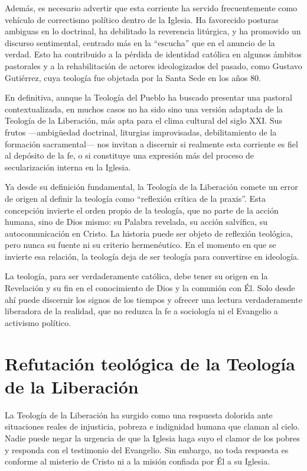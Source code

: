 \documentclass[12pt]{article}
\begin{document}
Además, es necesario advertir que esta corriente ha servido frecuentemente como vehículo de correctismo político dentro de la Iglesia. Ha favorecido posturas ambiguas en lo doctrinal, ha debilitado la reverencia litúrgica, y ha promovido un discurso sentimental, centrado más en la “escucha” que en el anuncio de la verdad. Esto ha contribuido a la pérdida de identidad católica en algunos ámbitos pastorales y a la rehabilitación de actores ideologizados del pasado, como Gustavo Gutiérrez, cuya teología fue objetada por la Santa Sede en los años 80.

En definitiva, aunque la Teología del Pueblo ha buscado presentar una pastoral contextualizada, en muchos casos no ha sido sino una versión adaptada de la Teología de la Liberación, más apta para el clima cultural del siglo XXI. Sus frutos —ambigüedad doctrinal, liturgias improvisadas, debilitamiento de la formación sacramental— nos invitan a discernir si realmente esta corriente es fiel al depósito de la fe, o si constituye una expresión más del proceso de secularización interna en la Iglesia.

Ya desde su definición fundamental, la Teología de la Liberación comete un error de origen al definir la teología como “reflexión crítica de la praxis”. Esta concepción invierte el orden propio de la teología, que no parte de la acción humana, sino de Dios mismo: su Palabra revelada, su acción salvífica, su autocomunicación en Cristo. La historia puede ser objeto de reflexión teológica, pero nunca su fuente ni su criterio hermenéutico. En el momento en que se invierte esa relación, la teología deja de ser teología para convertirse en ideología.

La teología, para ser verdaderamente católica, debe tener su origen en la Revelación y su fin en el conocimiento de Dios y la comunión con Él. Solo desde ahí puede discernir los signos de los tiempos y ofrecer una lectura verdaderamente liberadora de la realidad, que no reduzca la fe a sociología ni el Evangelio a activismo político.


\section*{Refutación teológica de la Teología de la Liberación}

La Teología de la Liberación ha surgido como una respuesta dolorida ante situaciones reales de injusticia, pobreza e indignidad humana que claman al cielo. Nadie puede negar la urgencia de que la Iglesia haga suyo el clamor de los pobres y responda con el testimonio del Evangelio. Sin embargo, no toda respuesta es conforme al misterio de Cristo ni a la misión confiada por Él a su Iglesia.
\end{document}
